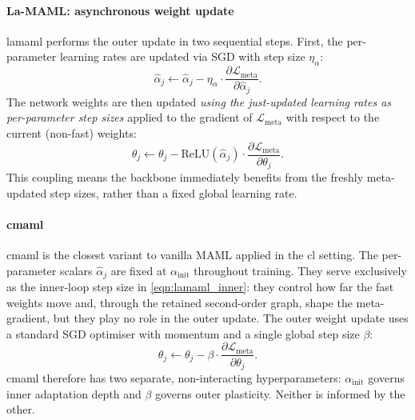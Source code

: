 \paragraph{La-MAML: asynchronous weight update}

\gls{lamaml} performs the outer update in two sequential steps. First, the per-parameter learning rates are updated via SGD with step size $\eta_\alpha$:
%
\begin{equation}\label{eqn:lamaml_lr_update}
    \hat\alpha_j
    \leftarrow
    \hat\alpha_j
    -
    \eta_\alpha \cdot
    \frac{\partial \mathcal{L}_\text{meta}}{\partial \hat\alpha_j}.
\end{equation}
%
The network weights are then updated \emph{using the just-updated learning rates as per-parameter step sizes} applied to the gradient of $\mathcal{L}_\text{meta}$ with respect to the current (non-fast) weights:
%
\begin{equation}\label{eqn:lamaml_weight_update}
    \theta_j
    \leftarrow
    \theta_j
    -
    \mathrm{ReLU}(\hat\alpha_j) \cdot
    \frac{\partial \mathcal{L}_\text{meta}}{\partial \theta_j}.
\end{equation}
%
This coupling means the backbone immediately benefits from the freshly meta-updated step sizes, rather than a fixed global learning rate.

\paragraph{\gls{cmaml}}

\gls{cmaml} is the closest variant to vanilla MAML \cite{} applied in the \gls{cl} setting. The per-parameter scalars $\hat\alpha_j$ are fixed at $\alpha_\text{init}$ throughout training. They serve exclusively as the inner-loop step size in \eqref{eqn:lamaml_inner}: they control how far the fast weights move and, through the retained second-order graph, shape the meta-gradient, but they play no role in the outer update. The outer weight update uses a standard SGD optimiser with momentum and a single global step size $\beta$:
%
\begin{equation}\label{eqn:cmaml_weight_update}
    \theta_j
    \leftarrow
    \theta_j
    -
    \beta \cdot
    \frac{\partial \mathcal{L}_\text{meta}}{\partial \theta_j}.
\end{equation}
%
\gls{cmaml} therefore has two separate, non-interacting hyperparameters: $\alpha_\text{init}$ governs inner adaptation depth and $\beta$ governs outer plasticity. Neither is informed by the other.

